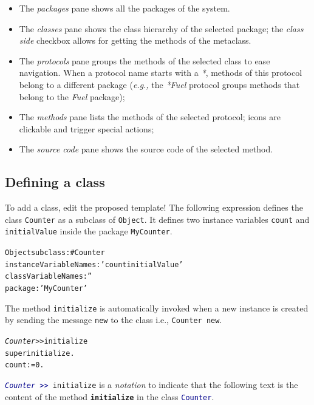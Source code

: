 \documentclass[notumble]{leaflet}
\makeatletter
\newcommand{\eg}{\emph{e.g.,}\xspace}
\newenvironment{displaycode}{%
     \par
     \hspace{1.5em}\begin{minipage}{\linewidth}
       \begin{alltt}\small}{
       \end{alltt}
     \end{minipage}
     \par}
\newcommand{\code}[1]{\foreignlanguage{english}{\texttt{#1}}}
\makeatother
\begin{document}
\begin{itemize}
\item The \emph{packages} pane shows all the packages of the system.
\item The \emph{classes} pane shows the class hierarchy of the
  selected package; the \emph{class side} checkbox allows for getting
  the methods of the metaclass.
\item The \emph{protocols} pane groups the methods of the selected
  class to ease navigation.  When a protocol name starts with a \emph{*}, methods of this
  protocol belong to a different package (\eg the \emph{*Fuel}
  protocol groups methods that belong to the \emph{Fuel} package);
\item The \emph{methods} pane lists the methods of the selected
  protocol; icons are clickable and trigger special actions;
\item The \emph{source code} pane shows the source code of the
  selected method. 
\end{itemize}

\vspace{-0.3cm}
\subsection{Defining a class}
To add a class, edit the proposed template!
The following expression defines the class \code{Counter} as a subclass of \code{Object}.
It defines two instance variables \code{count} and \code{initialValue} inside the package \code{MyCounter}.

\begin{displaycode}
Object subclass: #Counter
   instanceVariableNames: 'count initialValue'
   classVariableNames: '' 
   package: 'MyCounter'
\end{displaycode}

The method \code{initialize} is automatically invoked when a new instance is created by sending the message \code{new} to the class i.e., \code{Counter new}.   

\begin{displaycode}
\textit{Counter >>} initialize 
    super initialize.
    count := 0. 
\end{displaycode}

\code{\textcolor{darkBlue}{\textit{Counter}\,>{}>\,}initialize} is a \textit{notation} to indicate that the following text is the content of the method \code{\textbf{initialize}} in the class \code{\textcolor{darkBlue}{Counter}}.

\vspace{-0.3cm}
\end{document}

